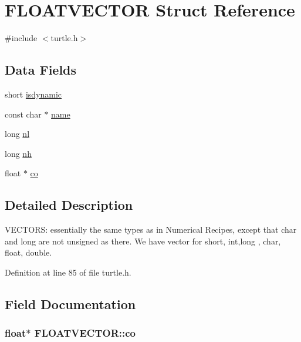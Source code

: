 \hypertarget{struct_f_l_o_a_t_v_e_c_t_o_r}{\section{F\-L\-O\-A\-T\-V\-E\-C\-T\-O\-R Struct Reference}
\label{struct_f_l_o_a_t_v_e_c_t_o_r}
}


{\ttfamily \#include $<$turtle.\-h$>$}

\subsection*{Data Fields}
\begin{DoxyCompactItemize}
\item 
short \hyperlink{struct_f_l_o_a_t_v_e_c_t_o_r_aead1bf05202464aeb2d3b722901b2ab9}{isdynamic}
\item 
const char $\ast$ \hyperlink{struct_f_l_o_a_t_v_e_c_t_o_r_a02528330e860856d608d3e836cb1d818}{name}
\item 
long \hyperlink{struct_f_l_o_a_t_v_e_c_t_o_r_a506e3cb41c8db89925ee596699bf5496}{nl}
\item 
long \hyperlink{struct_f_l_o_a_t_v_e_c_t_o_r_a069604cf1ee6da01ceb14e685d05f1d4}{nh}
\item 
float $\ast$ \hyperlink{struct_f_l_o_a_t_v_e_c_t_o_r_a0f81979d32a1ec80c6d2774bd21fb07a}{co}
\end{DoxyCompactItemize}


\subsection{Detailed Description}


 V\-E\-C\-T\-O\-R\-S\-: essentially the same types as in Numerical Recipes, except that char and long are not unsigned as there. We have vector for short, int,long , char, float, double. 

 

Definition at line 85 of file turtle.\-h.



\subsection{Field Documentation}
\hypertarget{struct_f_l_o_a_t_v_e_c_t_o_r_a0f81979d32a1ec80c6d2774bd21fb07a}{
\subsubsection[{co}]{\setlength{\rightskip}{0pt plus 5cm}float$\ast$ F\-L\-O\-A\-T\-V\-E\-C\-T\-O\-R\-::co}}\label{struct_f_l_o_a_t_v_e_c_t_o_r_a0f81979d32a1ec80c6d2774bd21fb07a}


